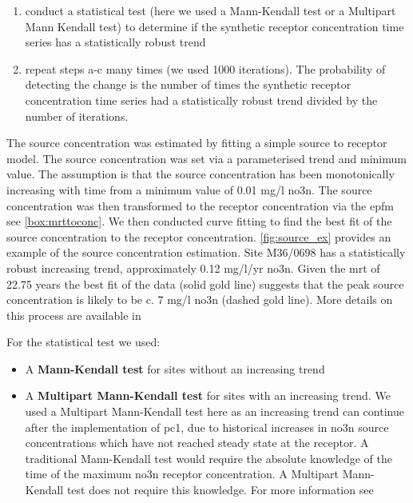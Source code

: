 \begin{enumerate}
\begin{enumerate}
        \item conduct a statistical test (here we used a Mann-Kendall test or a Multipart Mann Kendall test) to determine if the synthetic receptor concentration time series has a statistically robust trend
        \item repeat steps a-c many times (we used 1000 iterations). The probability of detecting the change is the number of times the synthetic receptor concentration time series had a statistically robust trend divided by the number of iterations.
    \end{enumerate}
\end{enumerate}

The source concentration was estimated by fitting a simple source to receptor model.
The source concentration was set via a parameterised trend and minimum value.
The assumption is that the source concentration has been monotonically increasing with time from a minimum value of 0.01 mg/l \gls{no3n}.
The source concentration was then transformed to the receptor concentration via the \gls{epfm} see \autoref{box:mrttoconc}.
We then conducted curve fitting to find the best fit of the source concentration to the receptor concentration.
\autoref{fig:source_ex} provides an example of the source concentration estimation.
Site M36/0698 has a statistically robust increasing trend, approximately 0.12 mg/l/yr \gls{no3n}.
Given the \gls{mrt} of 22.75 years the best fit of the data (solid gold line) suggests that the peak source concentration is likely to be c. 7 mg/l \gls{no3n} (dashed gold line).
More details on this process are available in \citet{dumont_determining_nodate, dumont_komanawagw_age_tools_2023}


For the statistical test we used:
\begin{itemize}
    \item A \textbf{Mann-Kendall test} for sites without an increasing trend
    \item A \textbf{Multipart Mann-Kendall test} for sites with an increasing trend. We used a Multipart Mann-Kendall test here as an increasing trend can continue after the implementation of \gls{pc1}, due to historical increases in \gls{no3n} source concentrations which have not reached steady state at the receptor. A traditional Mann-Kendall test would require the absolute knowledge of the time of the maximum \gls{no3n} receptor concentration. A Multipart Mann-Kendall test does not require this knowledge. For more information see \citet{dumont_komanawakendall_stats_2023}
\end{itemize}

